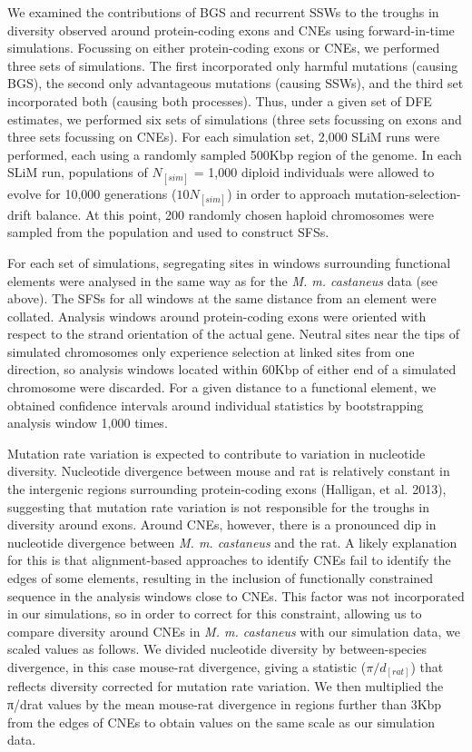 We examined the contributions of BGS and recurrent SSWs to the troughs in diversity observed around protein-coding exons and CNEs using forward-in-time simulations. Focussing on either protein-coding exons or CNEs, we performed three sets of simulations. The first incorporated only harmful mutations (causing BGS), the second only advantageous mutations (causing SSWs), and the third set incorporated both (causing both processes). Thus, under a given set of DFE estimates, we performed six sets of simulations (three sets focussing on exons and three sets focussing on CNEs). For each simulation set, 2,000 SLiM runs were performed, each using a randomly sampled 500Kbp region of the genome. In each SLiM run, populations of $N_[sim]$ = 1,000 diploid individuals were allowed to evolve for 10,000 generations ($10N_[sim]$) in order to approach mutation-selection-drift balance. At this point, 200 randomly chosen haploid chromosomes were sampled from the population and used to construct SFSs.
 
For each set of simulations, segregating sites in windows surrounding functional elements were analysed in the same way as for the \textit{M. m. castaneus} data (see above). The SFSs for all windows at the same distance from an element were collated. Analysis windows around protein-coding exons were oriented with respect to the strand orientation of the actual gene. Neutral sites near the tips of simulated chromosomes only experience selection at linked sites from one direction, so analysis windows located within 60Kbp of either end of a simulated chromosome were discarded. For a given distance to a functional element, we obtained confidence intervals around individual statistics by bootstrapping analysis window 1,000 times.

Mutation rate variation is expected to contribute to variation in nucleotide diversity. Nucleotide divergence between mouse and rat is relatively constant in the intergenic regions surrounding protein-coding exons (Halligan, et al. 2013), suggesting that mutation rate variation is not responsible for the troughs in diversity around exons. Around CNEs, however, there is a pronounced dip in nucleotide divergence between \textit{M. m. castaneus} and the rat. A likely explanation for this is that alignment-based approaches to identify CNEs fail to identify the edges of some elements, resulting in the inclusion of functionally constrained sequence in the analysis windows close to CNEs. This factor was not incorporated in our simulations, so in order to correct for this constraint, allowing us to compare diversity around CNEs in \textit{M. m. castaneus} with our simulation data, we scaled values as follows. We divided nucleotide diversity by between-species divergence, in this case mouse-rat divergence, giving a statistic ($\pi/d_[rat]$) that reflects diversity corrected for mutation rate variation. We then multiplied the π/drat values by the mean mouse-rat divergence in regions further than 3Kbp from the edges of CNEs to obtain values on the same scale as our simulation data.

